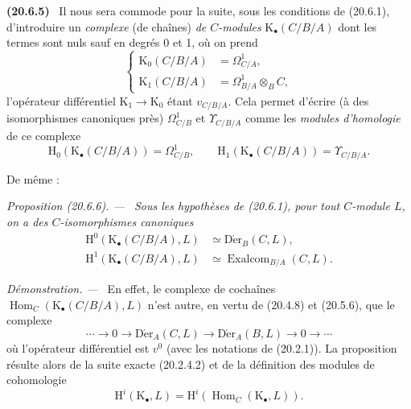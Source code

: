 \documentclass[10pt,oneside]{book}
\makeatletter
\newcommand{\setmanualcurrentlabel}[1]{\def\@currentlabel{#1}}
\newcommand{\oldpage}[2][]{%
  \setcounter{footnote}{0}%
  \marginpar{\scriptsize\textbf{#1}~|~#2}\ignorespaces}
\newenvironment{env}[1][]{\setmanualcurrentlabel{#1}\par\medskip\noindent\textbf{(#1)}\ }{\par}
\newenvironment{proposition}[1][]{%
  \setmanualcurrentlabel{#1}\par\medskip\noindent\itshape Proposition (#1). ---\ }{\par}
\newenvironment{proof}{%
  \par\medskip\noindent\textit{Démonstration. ---\ }}{\par}
\makeatother
\begin{document}
\begin{env}[20.6.5]
\label{0.20.6.5-fr}
Il nous sera commode pour la suite, sous les conditions de (20.6.1),
d'introduire un \emph{complexe} (de chaînes) \emph{de $C$-modules}
$\mathrm{K}_\bullet(C/B/A)$ dont les termes sont nuls sauf en degrés 0
et 1, où on prend
\begin{equation}
\tag{20.6.5.1}
\label{0.20.6.5.1-fr}
\left\{
\begin{aligned}
  \mathrm{K}_0(C/B/A)&=\Omega^1_{C/A},\\
  \mathrm{K}_1(C/B/A)&=\Omega^1_{B/A}\otimes_B C,
\end{aligned}
\right.
\end{equation}
l'opérateur différentiel $\mathrm{K}_1\to\mathrm{K}_0$ étant
$v_{C/B/A}$. Cela permet d'écrire (à des isomorphismes canoniques près)
$\Omega^1_{C/B}$ et $\Upsilon_{C/B/A}$ comme les \emph{modules
d'homologie} de ce complexe
\begin{equation}
\tag{20.6.5.2}
\label{0.20.6.5.2-fr}
  \mathrm{H}_0(\mathrm{K}_\bullet(C/B/A))=\Omega^1_{C/B},\qquad
  \mathrm{H}_1(\mathrm{K}_\bullet(C/B/A))=\Upsilon_{C/B/A}.
\end{equation}
\end{env}

De même :
\begin{proposition}[20.6.6]
\label{0.20.6.6-fr}
Sous les hypothèses de (20.6.1), pour tout $C$-module $L$, on a des
$C$-isomorphismes canoniques
\begin{align}
\tag{20.6.6.1}
\label{0.20.6.6.1-fr}
  \mathrm{H}^0(\mathrm{K}_\bullet(C/B/A),L)&\simeq\operatorname{D\acute{e}r}_B(C,L),\\
\tag{20.6.6.2}
\label{0.20.6.6.2-fr}
  \mathrm{H}^1(\mathrm{K}_\bullet(C/B/A),L)&\simeq
  \operatorname{Exalcom}_{B/A}(C,L).
\end{align}
\end{proposition}

\begin{proof}
En effet, le complexe de cochaînes
$\operatorname{Hom}_C(\mathrm{K}_\bullet(C/B/A),L)$ n'est autre, en vertu de (20.4.8)
et (20.5.6), que le complexe
\[
  \cdots\longrightarrow0\longrightarrow\operatorname{D\acute{e}r}_A(C,L)
  \longrightarrow\operatorname{D\acute{e}r}_A(B,L)\longrightarrow0\longrightarrow\cdots
\]
\oldpage[0\textsubscript{IV-1}]{138}
où l'opérateur différentiel est $v^0$ (avec les notations de (20.2.1)).
La proposition résulte alors de la suite exacte (20.2.4.2) et de la
définition des modules de cohomologie
\begin{equation}
\tag{20.6.6.3}
\label{0.20.6.6.3-fr}
  \mathrm{H}^i(\mathrm{K}_\bullet,L)=
  \mathrm{H}^i(\operatorname{Hom}_C(\mathrm{K}_\bullet,L)).
\end{equation}
\end{proof}
\end{document}
